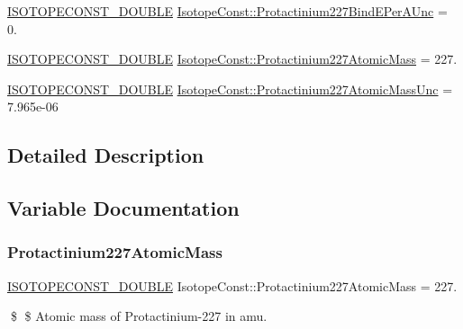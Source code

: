 \begin{DoxyCompactItemize}
\item 
\mbox{\hyperlink{group___isotope_const-_macros_ga8f45a7272ce02c0b4c65c44636ed719a}{I\+S\+O\+T\+O\+P\+E\+C\+O\+N\+S\+T\+\_\+\+D\+O\+U\+B\+LE}} \mbox{\hyperlink{group___isotope_const-_protactinium-_pa227_gab973403853f3d25b139a6a21af10fd6b}{Isotope\+Const\+::\+Protactinium227\+Bind\+E\+Per\+A\+Unc}} = 0.
\item 
\mbox{\hyperlink{group___isotope_const-_macros_ga8f45a7272ce02c0b4c65c44636ed719a}{I\+S\+O\+T\+O\+P\+E\+C\+O\+N\+S\+T\+\_\+\+D\+O\+U\+B\+LE}} \mbox{\hyperlink{group___isotope_const-_protactinium-_pa227_ga122eac2acdeb6dc6dcfda07c997ec4ca}{Isotope\+Const\+::\+Protactinium227\+Atomic\+Mass}} = 227.
\item 
\mbox{\hyperlink{group___isotope_const-_macros_ga8f45a7272ce02c0b4c65c44636ed719a}{I\+S\+O\+T\+O\+P\+E\+C\+O\+N\+S\+T\+\_\+\+D\+O\+U\+B\+LE}} \mbox{\hyperlink{group___isotope_const-_protactinium-_pa227_ga5e141ec16b07101fde23d8d2a454ccbe}{Isotope\+Const\+::\+Protactinium227\+Atomic\+Mass\+Unc}} = 7.\+965e-\/06
\end{DoxyCompactItemize}


\subsection{Detailed Description}


\subsection{Variable Documentation}
\mbox{\label{group___isotope_const-_protactinium-_pa227_ga122eac2acdeb6dc6dcfda07c997ec4ca}} 
\subsubsection{\texorpdfstring{Protactinium227\+Atomic\+Mass}{Protactinium227AtomicMass}}
{\footnotesize\ttfamily \mbox{\hyperlink{group___isotope_const-_macros_ga8f45a7272ce02c0b4c65c44636ed719a}{I\+S\+O\+T\+O\+P\+E\+C\+O\+N\+S\+T\+\_\+\+D\+O\+U\+B\+LE}} Isotope\+Const\+::\+Protactinium227\+Atomic\+Mass = 227.}

\$ \$ Atomic mass of Protactinium-\/227 in amu. \mbox{\label{group___isotope_const-_protactinium-_pa227_ga5e141ec16b07101fde23d8d2a454ccbe}} 
